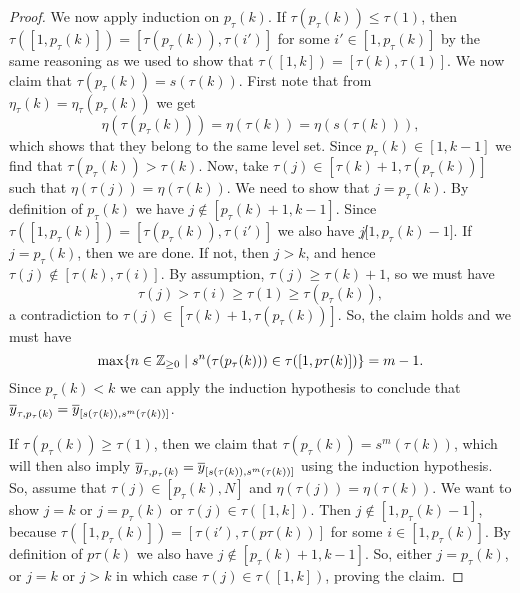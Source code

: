 \begin{proof}
	We now apply induction on $p_\tau(k)$. If $\tau(p_\tau(k)) \leq \tau(1)$, then
	$\tau([1, p_\tau(k)]) = [\tau(p_\tau(k)), \tau(i')]$ for some $i' \in [1, p_\tau(k)]$
	by the same reasoning as we used to show that $\tau([1, k]) = [\tau(k), \tau(1)]$. We
	now claim that $\tau(p_\tau(k)) = s(\tau(k))$. First note that from $\eta_\tau (k) =
		\eta_\tau(p_{\tau}(k))$ we get
	\begin{equation*}
		\eta(\tau(p_\tau(k))) = \eta(\tau(k)) = \eta(s(\tau(k))),
	\end{equation*}
	which shows that they belong to the same level set. Since $p_\tau(k) \in [1, k-1]$ we
	find that $\tau(p_\tau(k)) > \tau(k)$. Now, take $\tau(j) \in [\tau(k) + 1,
			\tau(p_\tau(k))]$ such that $\eta(\tau(j)) = \eta(\tau(k))$. We need to show that $j =
		p_\tau(k)$. By definition of $p_\tau(k)$ we have $j \notin [p_\tau(k) + 1, k-1]$. Since
	$\tau([1, p_\tau(k)]) = [\tau(p_\tau(k)), \tau(i')]$ we also have $j \not [1, p_\tau(k)
			- 1]$. If $j = p_\tau(k)$, then we are done. If not, then $j > k$, and hence $\tau(j)
		\notin [\tau(k), \tau(i)]$. By assumption, $\tau(j) \geq \tau(k) + 1$, so we must have
	\begin{equation*}
		\tau(j) > \tau(i) \geq \tau(1) \geq \tau(p_\tau(k)),
	\end{equation*}
	a contradiction to $\tau(j) \in [\tau(k) + 1, \tau(p_\tau(k))]$. So, the claim holds and we must have
	\begin{equation*}
		\max\{n \in \mathbb{Z}_{\geq 0} \mid s^n(\tau(p_\tau(k))) \in \tau([1, p\tau(k)])\} = m-1.
	\end{equation*}
	Since $p_\tau(k) < k$ we can apply the induction hypothesis to conclude that
	$\overline{y}_{\tau, p_\tau(k)} = \overline{y}_{[s(\tau(k)), s^m(\tau(k))]}$.

	If $\tau(p_\tau(k)) \geq \tau(1)$, then we claim that $\tau(p_\tau(k)) = s^m(\tau(k))$,
	which will then also imply $\overline{y}_{\tau, p_\tau(k)} = \overline{y}_{[s(\tau(k)), s^m(\tau(k))]}$
	using the induction hypothesis. So, assume that $\tau(j) \in [p_\tau(k), N]$ and
	$\eta(\tau(j)) = \eta(\tau(k))$. We want to show $j=k$ or $j = p_\tau(k)$ or $\tau(j)
		\in \tau([1, k])$. Then $j \notin [1, p_\tau(k) - 1]$, because $\tau([1, p_\tau(k)]) =
		[\tau(i'), \tau(p\tau(k))]$ for some $i \in [1, p_\tau(k)]$. By definition of
	$p\tau(k)$ we also have $j \notin [p_\tau(k) + 1, k -1]$. So, either $j = p_\tau(k)$,
	or $j = k$ or $j > k$ in which case $\tau(j) \in \tau([1, k])$, proving the claim.


\end{proof}
